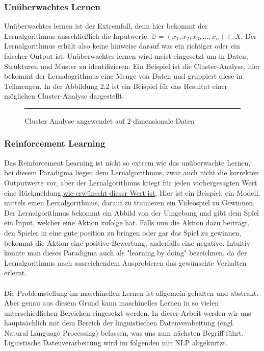 \documentclass[12pt,letterpaper,ngerman]{article}
\begin{document}
\subsubsection{Unüberwachtes Lernen}
Unüberwachtes lernen ist der Extremfall, denn hier bekommt der Lernalgorithmus
ausschließlich die Inputwerte: 
$\mathbb{D} = (x_1, x_2, x_3, \dots, x_n) \subset X$.
Der Lernalgorithmus erhält also keine hinweise darauf was ein 
richtiger oder ein falscher Output ist. Unüberwachtes lernen 
wird meist eingesetzt um in Daten, Strukturen und Muster zu 
identifizieren. Ein Beispiel ist die Cluster-Analyse,
hier bekommt der Lernalogrithmus eine Menge von Daten und 
gruppiert diese in Teilmengen. In der Abbildung 2.2 ist ein Beispiel
für das Resultat einer möglichen Cluster-Analyse dargestellt.
\begin{figure}[H]
  \centering
  \rule{1cm}{1cm}%
  \caption{Cluster Analyse angewendet auf 2-dimensionale Daten}
\end{figure}

\subsubsection{Reinforcement Learning}
Das Reinforcement Learning ist nicht so extrem wie das unüberwachte Lernen,
bei diesem Paradigma liegen dem Lernalgorithmus, zwar auch nicht die korrekten
Outputwerte vor, aber der Lernalgorithmus kriegt für jeden vorhergesagten Wert
eine Rückmeldung,\underline{wie erwünscht dieser Wert ist}. Hier ist ein Beispiel,
ein Modell, mittels einen Lernalgorithmus, darauf zu trainieren ein Videospiel
zu Gewinnen. Der Lernalgorithmus bekommt ein Abbild von der Umgebung und gibt dem
Spiel ein Input, welcher eine Aktion zufolge hat. Falls nun die Aktion dazu beiträgt, 
den Spieler in eine gute position zu bringen oder gar das Spiel zu gewinnen, bekommt 
die Aktion eine positive Bewertung, anderfalls eine negative. Intuitiv 
könnte man dieses Paradigma auch als "learning by doing" bezeichnen, da
der Lernalgorithmus nach ausreichendem Ausprobieren das gewünschte 
Verhalten erlernt.\\\\
Die Problemstellung im maschinellen Lernen ist allgemein gehalten und abstrakt.
Aber genau aus diesem Grund kann maschinelles Lernen in so vielen unterschiedlichen
Bereichen eingesetzt werden. In dieser Arbeit werden wir uns hauptsächlich 
mit dem Bereich der linguistischen Datenverabeitung 
(engl. Natural Language Processing) befassen, was uns zum nächsten Begriff
führt. Liguistische Datenverarbeitung wird im folgenden mit NLP abgekürtzt.
\end{document}
